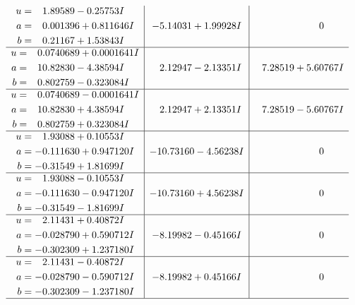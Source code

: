 \documentclass[1p]{elsarticle_modified}
\theoremstyle{definition}
\begin{document}
$$\begin{array}{c|c|c}
\begin{aligned}
u &= \phantom{-}1.89589 - 0.25753 I \\
a &= \phantom{-}0.001396 + 0.811646 I \\
b &= \phantom{-}0.21167 + 1.53843 I\end{aligned}
 & -5.14031 + 1.99928 I & \phantom{-0.000000 } 0 \\ \hline\begin{aligned}
u &= \phantom{-}0.0740689 + 0.0001641 I \\
a &= \phantom{-}10.82830 - 4.38594 I \\
b &= \phantom{-}0.802759 - 0.323084 I\end{aligned}
 & \phantom{-}2.12947 - 2.13351 I & \phantom{-}7.28519 + 5.60767 I \\ \hline\begin{aligned}
u &= \phantom{-}0.0740689 - 0.0001641 I \\
a &= \phantom{-}10.82830 + 4.38594 I \\
b &= \phantom{-}0.802759 + 0.323084 I\end{aligned}
 & \phantom{-}2.12947 + 2.13351 I & \phantom{-}7.28519 - 5.60767 I \\ \hline\begin{aligned}
u &= \phantom{-}1.93088 + 0.10553 I \\
a &= -0.111630 + 0.947120 I \\
b &= -0.31549 + 1.81699 I\end{aligned}
 & -10.73160 - 4.56238 I & \phantom{-0.000000 } 0 \\ \hline\begin{aligned}
u &= \phantom{-}1.93088 - 0.10553 I \\
a &= -0.111630 - 0.947120 I \\
b &= -0.31549 - 1.81699 I\end{aligned}
 & -10.73160 + 4.56238 I & \phantom{-0.000000 } 0 \\ \hline\begin{aligned}
u &= \phantom{-}2.11431 + 0.40872 I \\
a &= -0.028790 + 0.590712 I \\
b &= -0.302309 + 1.237180 I\end{aligned}
 & -8.19982 - 0.45166 I & \phantom{-0.000000 } 0 \\ \hline\begin{aligned}
u &= \phantom{-}2.11431 - 0.40872 I \\
a &= -0.028790 - 0.590712 I \\
b &= -0.302309 - 1.237180 I\end{aligned}
 & -8.19982 + 0.45166 I & \phantom{-0.000000 } 0\\
 \hline 
 \end{array}$$\newpage\newpage\renewcommand{\arraystretch}{1}
\end{document}
